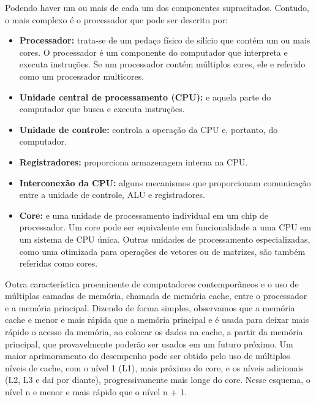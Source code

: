 \documentclass{article}
\begin{document}
Podendo haver um ou mais de cada um dos componentes supracitados. Contudo, o
mais complexo é o processador que pode ser descrito por:

\begin{itemize}
    \item \textbf{Processador:} trata-se de um pedaço físico de silício que
        contém um ou mais cores. O processador é um componente do computador
        que interpreta e executa instruções. Se um processador contém múltiplos
        cores, ele e referido como um processador multicores.
    \item \textbf{Unidade central de processamento (CPU):} e aquela parte do
        computador que busca e executa instruções.
    \item \textbf{Unidade de controle:} controla a operação da CPU e, portanto,
        do computador.
    \item \textbf{Registradores:} proporciona armazenagem interna na CPU.
    \item \textbf{Interconexão da CPU:} alguns mecanismos que proporcionam
        comunicação entre a unidade de controle, ALU e registradores.
    \item \textbf{Core:} e uma unidade de processamento individual em um chip
        de processador. Um core pode ser equivalente em funcionalidade a uma
        CPU em um sistema de CPU única. Outras unidades de processamento
        especializadas, como uma otimizada para operações de vetores ou de
        matrizes, são também referidas como cores.
\end{itemize}

Outra característica proeminente de computadores contemporâneos e o uso de
múltiplas camadas de memória, chamada de memória cache, entre o processador e a
memória principal. Dizendo de forma simples, observamos que a memória cache e
menor e mais rápida que a memória principal e é usada para deixar mais rápido o
acesso da memória, ao colocar os dados na cache, a partir da memória principal,
que provavelmente poderão ser usados em um futuro próximo. Um maior
aprimoramento do desempenho pode ser obtido pelo uso de múltiplos níveis de
cache, com o nível 1 (L1), mais próximo do core, e os níveis adicionais (L2, L3
e daí por diante), progressivamente mais longe do core. Nesse esquema, o nível
n e menor e mais rápido que o nível n + 1.
\end{document}
